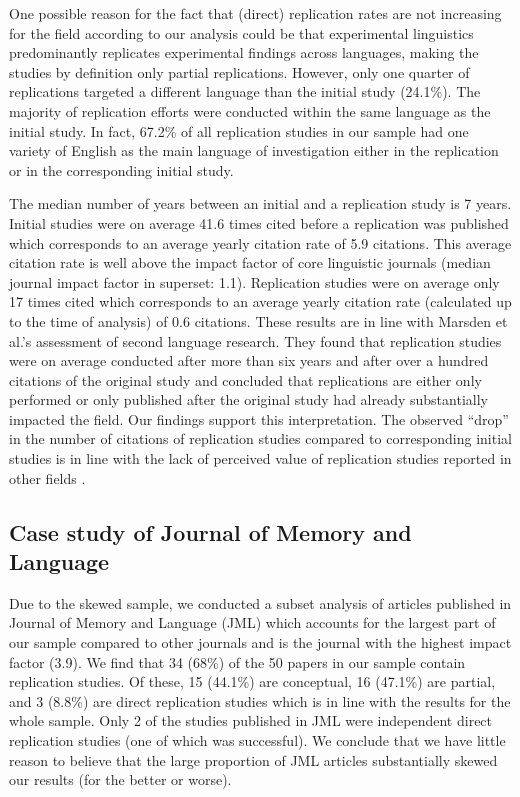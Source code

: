 \documentclass[cm,linguex]{glossa}
\begin{document}
One possible reason for the fact that (direct) replication rates are not increasing for the field according to our analysis could be that experimental linguistics predominantly replicates experimental findings across languages, making the studies by definition only partial replications.
However, only one quarter of replications targeted a different language than the initial study (24.1\%).
The majority of replication efforts were conducted within the same language as the initial study.
In fact, 67.2\% of all replication studies in our sample had one variety of English as the main language of investigation either in the replication or in the corresponding initial study.

The median number of years between an initial and a replication study is 7 years.
Initial studies were on average 41.6 times cited before a replication was published which corresponds to an average yearly citation rate of 5.9 citations.
This average citation rate is well above the impact factor of core linguistic journals (median journal impact factor in superset: 1.1).
Replication studies were on average only 17 times cited which corresponds to an average yearly citation rate (calculated up to the time of analysis) of 0.6 citations. These results are in line with Marsden et al.'s \citeyearpar{marsden_replication_2018} assessment of second language research. They found that replication studies were on average conducted after more than six years and after over a hundred citations of the original study and concluded that replications are either only performed or only published after the original study had already substantially impacted the field. Our findings support this interpretation.
The observed ``drop'' in the number of citations of replication studies compared to corresponding initial studies is in line with the lack of perceived value of replication studies reported in other fields \citep[e.g.,][]{koole_rewarding_2012, nosek_scientific_2012}.

\hypertarget{case-study-of-journal-of-memory-and-language}{%
\subsection{Case study of Journal of Memory and Language}\label{case-study-of-journal-of-memory-and-language}}

Due to the skewed sample, we conducted a subset analysis of articles published in Journal of Memory and Language (JML) which accounts for the largest part of our sample compared to other journals and is the journal with the highest impact factor (3.9). We find that 34 (68\%) of the 50 papers in our sample contain replication studies. Of these, 15 (44.1\%) are conceptual, 16 (47.1\%) are partial, and 3 (8.8\%) are direct replication studies which is in line with the results for the whole sample. Only 2 of the studies published in JML were independent direct replication studies (one of which was successful). We conclude that we have little reason to believe that the large proportion of JML articles substantially skewed our results (for the better or worse).
\end{document}
